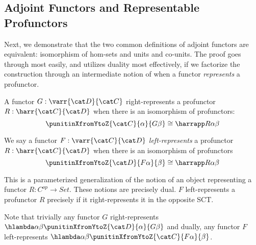 \subsection{Adjoint Functors and Representable Profunctors}

Next, we demonstrate that the two common definitions of adjoint
functors are equivalent: isomorphism of hom-sets and units and
co-units.
%
The proof goes through most easily, and utilizes duality most
effectively, if we factorize the construction through an intermediate
notion of when a functor \emph{represents} a profunctor.

\begin{definition}
  A functor $G : \varr{\cat D}{\cat C}$ right-represents a profunctor $R :
  \harr {\cat C}{\cat D}$ when there is an isomorphism of profunctors:
  \[ \punitinXfromYtoZ {\cat C} {\alpha} {G \beta} \cong \harrapp R {\alpha}{\beta}\]

  We say a functor $F : \varr{\cat C}{\cat D}$ \emph{left-represents} a profunctor $R : \harr {\cat C}{\cat D}$ when there is an isomorphism of profunctors
  \[ \punitinXfromYtoZ {\cat D} {F \alpha} {\beta} \cong \harrapp R {\alpha}{\beta}\]
\end{definition}

This is a parameterized generalization of the notion of an object
representing a functor $R : C^{op} \to Set$.
These notions are precisely dual. $F$ left-represents a profunctor $R$
precisely if it right-represents it in the opposite SCT.

Note that trivially any functor $G$ right-represents
$\hlambda\alpha\beta \punitinXfromYtoZ {\cat D}{\alpha} {G \beta}$ and
dually, any functor $F$ left-represents
$\hlambda\alpha\beta\punitinXfromYtoZ {\cat C}{F\alpha}{\beta}$.

